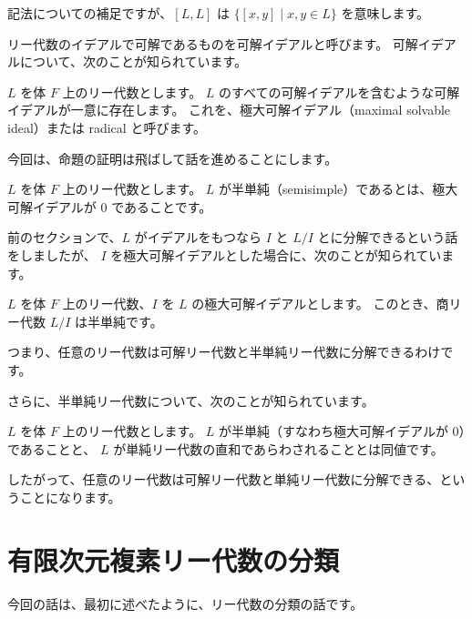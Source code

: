 \documentclass{ltjsarticle}
\begin{document}
記法についての補足ですが、\([L, L]\) は \( \{ [x, y] \mid x, y \in L \} \) を意味します。

リー代数のイデアルで可解であるものを可解イデアルと呼びます。
可解イデアルについて、次のことが知られています。

\begin{proposition}[極大可解イデアル]
    \(L\) を体 \(F\) 上のリー代数とします。
    \(L\) のすべての可解イデアルを含むような可解イデアルが一意に存在します。
    これを、極大可解イデアル（maximal solvable ideal）または radical と呼びます。
\end{proposition}

今回は、命題の証明は飛ばして話を進めることにします。

\begin{definition}[半単純]
    \(L\) を体 \(F\) 上のリー代数とします。
    \(L\) が半単純（semisimple）であるとは、極大可解イデアルが \(0\) であることです。
\end{definition}

前のセクションで、\(L\) がイデアルをもつなら \(I\) と \(L/I\) とに分解できるという話をしましたが、
\(I\) を極大可解イデアルとした場合に、次のことが知られています。

\begin{proposition}[極大可解イデアルによる商]
    \(L\) を体 \(F\) 上のリー代数、\(I\) を \(L\) の極大可解イデアルとします。
    このとき、商リー代数 \(L/I\) は半単純です。
\end{proposition}

つまり、任意のリー代数は可解リー代数と半単純リー代数に分解できるわけです。

さらに、半単純リー代数について、次のことが知られています。

\begin{proposition}[単純と半単純]
    \(L\) を体 \(F\) 上のリー代数とします。
    \(L\) が半単純（すなわち極大可解イデアルが \(0\)）であることと、
    \(L\) が単純リー代数の直和であらわされることとは同値です。
\end{proposition}

したがって、任意のリー代数は可解リー代数と単純リー代数に分解できる、ということになります。

\section{有限次元複素リー代数の分類}

今回の話は、最初に述べたように、リー代数の分類の話です。
\end{document}
